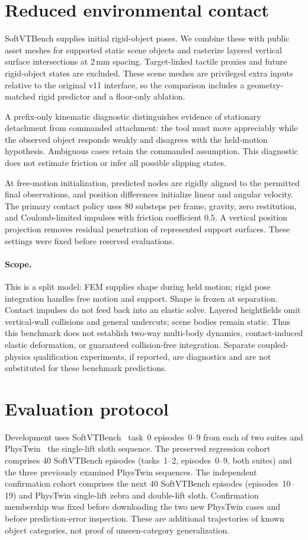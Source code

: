 \documentclass[10pt]{article}
\begin{document}
\section{Reduced environmental contact}
SoftVTBench supplies initial rigid-object poses. We combine these with public asset meshes for supported static scene objects and rasterize layered vertical surface intersections at 2\,mm spacing. Target-linked tactile proxies and future rigid-object states are excluded. These scene meshes are privileged extra inputs relative to the original v11 interface, so the comparison includes a geometry-matched rigid predictor and a floor-only ablation.

A prefix-only kinematic diagnostic distinguishes evidence of stationary detachment from commanded attachment: the tool must move appreciably while the observed object responds weakly and disagrees with the held-motion hypothesis. Ambiguous cases retain the commanded assumption. This diagnostic does not estimate friction or infer all possible slipping states.

At free-motion initialization, predicted nodes are rigidly aligned to the permitted final observations, and position differences initialize linear and angular velocity. The primary contact policy uses 80 substeps per frame, gravity, zero restitution, and Coulomb-limited impulses with friction coefficient $0.5$. A vertical position projection removes residual penetration of represented support surfaces. These settings were fixed before reserved evaluations.

\paragraph{Scope.}
This is a split model: FEM supplies shape during held motion; rigid pose integration handles free motion and support. Shape is frozen at separation. Contact impulses do not feed back into an elastic solve. Layered heightfields omit vertical-wall collisions and general undercuts; scene bodies remain static. Thus this benchmark does not establish two-way multi-body dynamics, contact-induced elastic deformation, or guaranteed collision-free integration. Separate coupled-physics qualification experiments, if reported, are diagnostics and are not substituted for these benchmark predictions.

\section{Evaluation protocol}
Development uses SoftVTBench~\cite{softvtbench} task~0 episodes~0--9 from each of two suites and PhysTwin~\cite{phystwin} the single-lift sloth sequence. The preserved regression cohort comprises 40 SoftVTBench episodes (tasks~1--2, episodes~0--9, both suites) and the three previously examined PhysTwin sequences. The independent confirmation cohort comprises the next 40 SoftVTBench episodes (episodes~10--19) and PhysTwin single-lift zebra and double-lift sloth. Confirmation membership was fixed before downloading the two new PhysTwin cases and before prediction-error inspection. These are additional trajectories of known object categories, not proof of unseen-category generalization.
\end{document}
